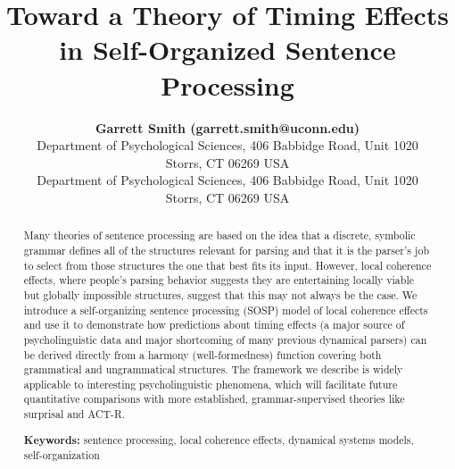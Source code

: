 \documentclass[10pt,letterpaper]{article}
\title{Toward a Theory of Timing Effects in Self-Organized Sentence Processing}
\author{{\large \bf Garrett Smith (garrett.smith@uconn.edu)} \\
  Department of Psychological Sciences, 406 Babbidge Road, Unit 1020\\
  Storrs, CT 06269 USA
  \AND {\large \bf Whitney Tabor (whitney.tabor@uconn.edu)} \\
  Department of Psychological Sciences, 406 Babbidge Road, Unit 1020\\
Storrs, CT 06269 USA}
\begin{document}
\maketitle\normalem

\begin{abstract}
Many theories of sentence processing are based on the idea that a discrete, symbolic grammar defines all of the structures relevant for parsing and that it is the parser's job to select from those structures the one that best fits its input. However, local coherence effects, where people's parsing behavior suggests they are entertaining locally viable but globally impossible structures, suggest that this may not always be the case. We introduce a self-organizing sentence processing (SOSP) model of local coherence effects and use it to demonstrate how predictions about timing effects (a major source of psycholinguistic data and major shortcoming of many previous dynamical parsers) can be derived directly from a harmony (well-formedness) function covering both grammatical and ungrammatical structures. The framework we describe is widely applicable to interesting psycholinguistic phenomena, which will facilitate future quantitative comparisons with more established, grammar-supervised theories like surprisal and ACT-R.

\textbf{Keywords:} sentence processing, local coherence effects, dynamical systems models, self-organization
\end{abstract}
\end{document}
